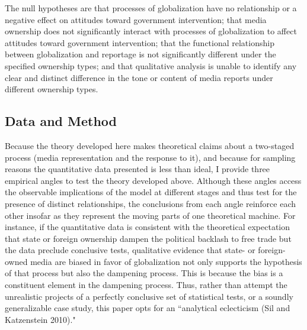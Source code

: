 \documentclass[12pt]{article}
\begin{document}
The null hypotheses are that processes of globalization have no relationship or a negative effect on attitudes toward government intervention; that media ownership does not significantly interact with processes of globalization to affect attitudes toward government intervention; that the functional relationship between globalization and reportage is not significantly different under the specified ownership types; and that qualitative analysis is unable to identify any clear and distinct difference in the tone or content of media reports under different ownership types.
\subsection{Data and Method}

Because the theory developed here makes theoretical claims about a two-staged process (media representation and the response to it), and because for sampling reasons the quantitative data presented is less than ideal, I provide three empirical angles to test the theory developed above. Although these angles access the observable implications of the model at different stages and thus test for the presence of distinct relationships, the conclusions from each angle reinforce each other insofar as they represent the moving parts of one theoretical machine. For instance, if the quantitative data is consistent with the theoretical expectation that state or foreign ownership dampen the political backlash to free trade but the data preclude conclusive tests, qualitative evidence that state- or foreign-owned media are biased in favor of globalization not only supports the hypothesis of that process but also the dampening process. This is because the bias is a constituent element in the dampening process. Thus, rather than attempt the unrealistic projects of a perfectly conclusive set of statistical tests, or a soundly generalizable case study, this paper opts for an ``analytical eclecticism (Sil and Katzenstein 2010)."
\end{document}
